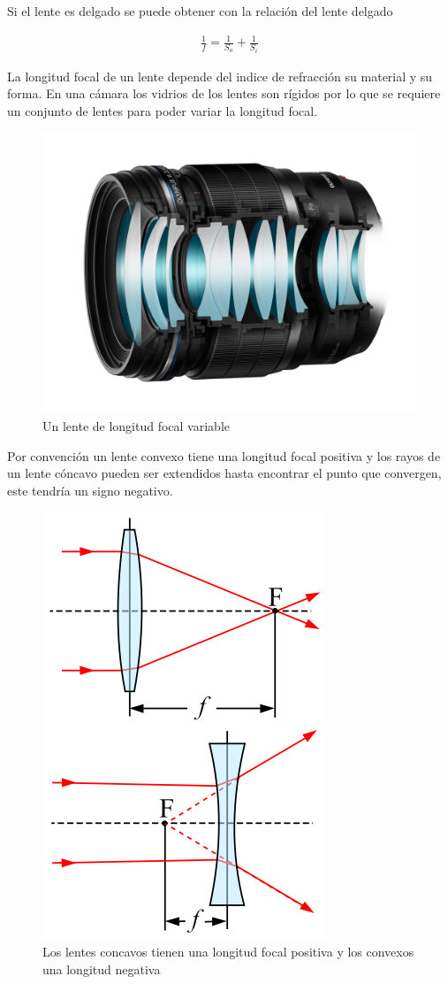 \documentclass{article}
\begin{document}
Si el lente es delgado se puede obtener con la relación del lente delgado

\begin{align*}
	\frac{1}{f} = \frac{1}{S_o} +\frac{1}{S_i}
\end{align*}

La longitud focal de un lente depende del indice de refracción su material y su forma. En una cámara los vidrios de los lentes son rígidos por lo que se requiere un conjunto de lentes para poder variar la longitud focal.

\begin{figure}[H]
	\centering
	\includegraphics[width=0.60\linewidth]{Figuras/Viariable_focal_length}
	\caption{Un lente de longitud focal variable}
	\label{fig:viariablefocallength}
\end{figure}

Por convención un lente convexo tiene una longitud focal positiva y los rayos de un lente cóncavo pueden ser extendidos hasta encontrar el punto que convergen, este tendría un signo negativo.

\begin{figure}[H]
	\centering
	\includegraphics[width=0.50\linewidth]{Figuras/Focal_Length_Concave_Convex}
	\caption{Los lentes concavos tienen una longitud focal positiva y los convexos una longitud negativa}
	\label{fig:focallengthconcaveconvex}
\end{figure}
\end{document}
